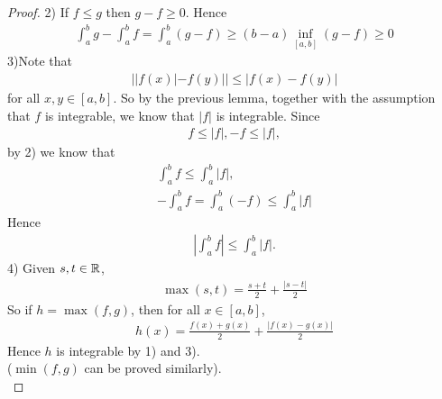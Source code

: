 \documentclass[a4paper]{article}
\begin{document}
\begin{thm}
\begin{proof}
2) If $f\leq g$ then $g-f\geq 0$. Hence
\begin{equation*}
\begin{aligned}
\int_a^b g - \int_a^b f = \int_a^b \left(g-f\right) \geq \left(b-a\right) \inf_{\left[a,b\right]} \left(g-f\right) \geq 0
\end{aligned}
\end{equation*}
3)Note that
\begin{equation*}
\begin{aligned}
||f\left(x\right)| - f\left(y\right)|| \leq |f\left(x\right) - f\left(y\right) |
\end{aligned}
\end{equation*}
for all $x,y\in\left[a,b\right]$. So by the previous lemma, together with the assumption that $f$ is integrable, we know that $|f|$ is integrable. Since
\begin{equation*}
\begin{aligned}
f\leq |f|, -f \leq |f|,
\end{aligned}
\end{equation*}
by 2) we know that
\begin{equation*}
\begin{aligned}
\int_a^b f \leq \int_a^b |f|,\\
-\int_a^b f = \int_a^b \left(-f\right) \leq \int_a^b |f|
\end{aligned}
\end{equation*}
Hence
\begin{equation*}
\begin{aligned}
|\int_a^b f| \leq \int_a^b |f|.
\end{aligned}
\end{equation*}
4) Given $s,t\in \mathbb{R}$,
\begin{equation*}
\begin{aligned}
\max\left(s,t\right) = \frac{s+t}{2} + \frac{|s-t|}{2}
\end{aligned}
\end{equation*}
So if $h=\max\left(f,g\right)$, then for all $x\in\left[a,b\right]$,
\begin{equation*}
\begin{aligned}
h\left(x\right) = \frac{f\left(x\right) + g\left(x\right)}{2} + \frac{|f\left(x\right) - g\left(x\right)|}{2}
\end{aligned}
\end{equation*}
Hence $h$ is integrable by 1) and 3).\\
($\min\left(f,g\right)$ can be proved similarly).\\

\end{proof}
\end{thm}
\end{document}
